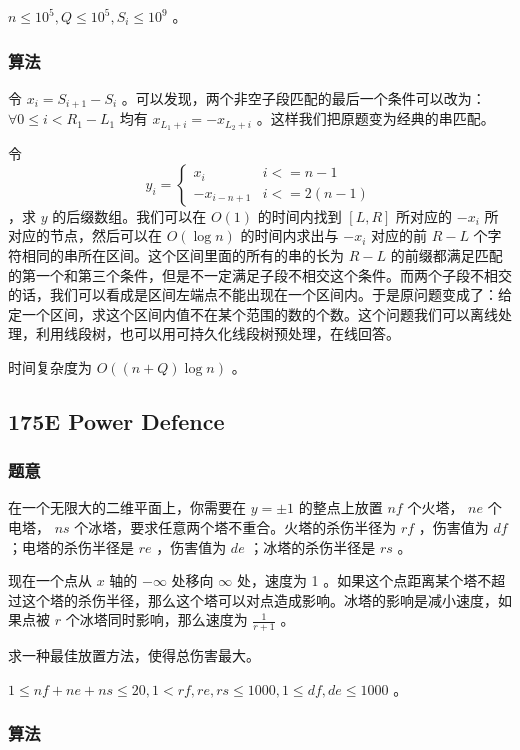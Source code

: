 \documentclass[11pt]{article}
\begin{document}
    $n \leq 10^5, Q \leq 10^5, S_i \leq 10^9$ 。
\subsubsection{算法}
\label{sec-10-2-2}

    令 $x_i = S_{i + 1} - S_i$ 。可以发现，两个非空子段匹配的最后一个条件可以改为： $\forall 0 \leq i < R_1 - L_1$ 均有 $x_{L_1 + i} = -x_{L_2 + i}$ 。这样我们把原题变为经典的串匹配。

    令 $$y_i = \begin{cases} x_i & i <= n - 1 \\ -x_{i - n + 1} & i <= 2 (n - 1) \end{cases}$$ ，求 $y$ 的后缀数组。我们可以在 $O(1)$ 的时间内找到 $[L, R]$ 所对应的 ${-x_i}$ 所对应的节点，然后可以在 $O(\log n)$ 的时间内求出与 ${-x_i}$ 对应的前 $R - L$ 个字符相同的串所在区间。这个区间里面的所有的串的长为 $R - L$ 的前缀都满足匹配的第一个和第三个条件，但是不一定满足子段不相交这个条件。而两个子段不相交的话，我们可以看成是区间左端点不能出现在一个区间内。于是原问题变成了：给定一个区间，求这个区间内值不在某个范围的数的个数。这个问题我们可以离线处理，利用线段树，也可以用可持久化线段树预处理，在线回答。

    时间复杂度为 $O((n + Q) \log n)$ 。
\subsection{175E  Power Defence}
\label{sec-10-3}
\subsubsection{题意}
\label{sec-10-3-1}

    在一个无限大的二维平面上，你需要在 $y = \pm 1$ 的整点上放置 $nf$ 个火塔， $ne$ 个电塔， $ns$ 个冰塔，要求任意两个塔不重合。火塔的杀伤半径为 $rf$ ，伤害值为 $df$ ；电塔的杀伤半径是 $re$ ，伤害值为 $de$ ；冰塔的杀伤半径是 $rs$ 。

    现在一个点从 $x$ 轴的 $-\infty$ 处移向 $\infty$ 处，速度为 1 。如果这个点距离某个塔不超过这个塔的杀伤半径，那么这个塔可以对点造成影响。冰塔的影响是减小速度，如果点被 $r$ 个冰塔同时影响，那么速度为 $\frac{1}{r + 1}$ 。

    求一种最佳放置方法，使得总伤害最大。

    $1 \leq nf + ne + ns \leq 20, 1 < rf, re, rs \leq 1000, 1 \leq df, de \leq 1000$ 。
\subsubsection{算法}
\label{sec-10-3-2}
\end{document}

